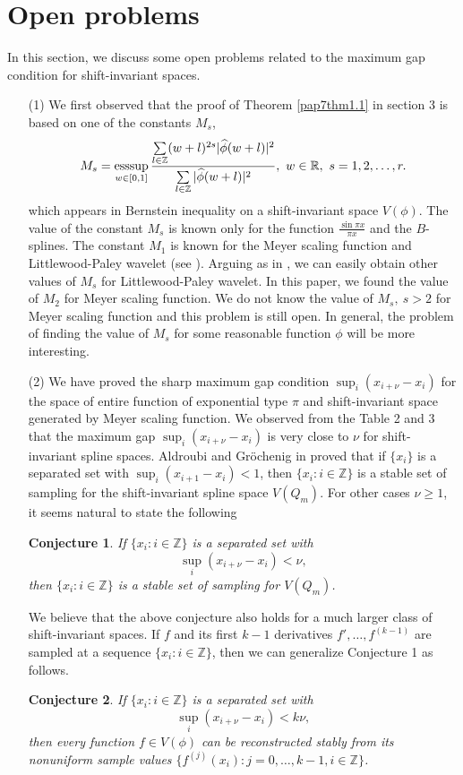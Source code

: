 \documentclass[a4paper,12pt,reqno]{amsart}
\theoremstyle{plain}
\numberwithin{equation}{section}
\newtheorem{conj}{Conjecture}
\theoremstyle{definition}
\newcounter {own}
\begin{document}
\section{Open problems}
In this section, we discuss some open problems related to the maximum gap condition for shift-invariant spaces.
\begin{itemize}
 \item [(1)] We first observed that the proof of Theorem \ref{pap7thm1.1} in section 3 is based on one of the constants $M_{s}$,
\begin{equation}
M_{s}=\mathop{\rm{esssup}}\limits_{w\in[0,1]}\dfrac{\sum\limits_{l\in\mathbb{Z}}(w+l)^{2s}|\widehat{\phi}(w+l)|^2}{\sum\limits_{l\in\mathbb{Z}}|\widehat{\phi}(w+l)|^2},~w\in\mathbb{R},~s=1,2,\dots,r.
\end{equation}
which appears in Bernstein inequality on a shift-invariant space $V(\phi)$.
The value of the constant $M_s$ is known only for the function $\tfrac{\sin \pi x}{\pi x}$ and  the $B$-splines.
The constant $M_1$ is known for the Meyer scaling function and Littlewood-Paley wavelet (see \cite{AntoRad3}). 
Arguing as in \cite{AntoRad3}, we  can easily obtain other values of $M_s$ for Littlewood-Paley wavelet. In this paper, we found the value of $M_2$ for Meyer scaling function. 
We do not know the value of $M_s,~s>2$ for Meyer scaling function and this problem is still open. In general,  the problem of finding the value of $M_s$ for some reasonable function $\phi$ will be more interesting.
\end{itemize}
\begin{itemize}
\item [(2)]  We have proved the sharp maximum gap condition $\sup_{i}(x_{i+\nu}-x_i)$ for the space of entire function of exponential type $\pi$ and  shift-invariant space generated by Meyer scaling function.
We observed from the Table 2 and 3 that the maximum gap $\sup_{i}(x_{i+\nu}-x_i)$ is very close to $\nu$ for shift-invariant spline spaces. 
Aldroubi and Gr\"{o}chenig in \cite{AlGr1} proved that if $\{x_{i}\}$ is  a separated set with $\sup_{i}(x_{i+1}-x_i)<1$, 
then  $\{x_i:i\in\mathbb{Z}\}$ is a stable set of sampling for the shift-invariant spline space $V(Q_m)$. For other cases $\nu\geq1$, it seems natural to state the following 
\begin{conj}
If $\{x_i:i\in\mathbb{Z}\}$ is  a separated 
set with $$\sup\limits_{i}(x_{i+\nu}-x_i)<\nu,$$ 
then  $\{x_i:i\in\mathbb{Z}\}$ is a stable set of sampling for $V(Q_m)$.
\end{conj}
We believe that the above conjecture also holds for a much larger class of shift-invariant spaces.
If $f$ and its first $k-1$ derivatives $f', \dots,f^{(k-1)}$ are sampled at a sequence $\{x_i:i\in\mathbb{Z}\}$, then we can generalize Conjecture 1 as follows.
\begin{conj}
If $\{x_{i}:i\in\mathbb{Z}\}$ is  a separated set with $$\sup\limits_{i}(x_{i+\nu}-x_i)<k\nu,$$
then every function $f\in V(\phi)$ can be reconstructed stably from its nonuniform sample values  $\{f^{(j)}(x_i):j=0,\dots, k-1, i\in\mathbb{Z}\}$.
\end{conj}
\end{itemize}
\end{document}
